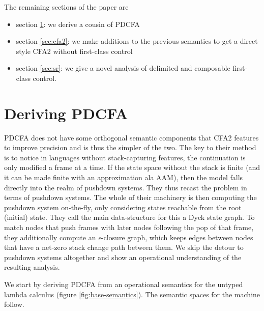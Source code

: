 The remaining sections of the paper are
\begin{itemize}
\item{section \ref{sec:pdcfa}: we derive a cousin of PDCFA}
\item{section \ref{sec:cfa2}: we make additions to the previous semantics to get a direct-style CFA2 without first-class control}
\item{section \ref{sec:sr}: we give a novel analysis of delimited and composable first-class control.}
\end{itemize}

\section{Deriving PDCFA}
\label{sec:pdcfa}

PDCFA does not have some orthogonal semantic components that CFA2 features to improve precision and is thus the simpler of the two.
%
The key to their method is to notice in languages without stack-capturing features, the continuation is only modified a frame at a time.
%
If the state space without the stack is finite (and it can be made finite with an approximation ala AAM), then the model falls directly into the realm of pushdown systems.
%
They thus recast the problem in terms of pushdown systems.
%
The whole of their machinery is then computing the pushdown system on-the-fly, only considering states reachable from the root (initial) state.
%
They call the main data-structure for this a Dyck state graph.
%
To match nodes that push frames with later nodes following the pop of that frame, they additionally compute an $\epsilon$-closure graph, which keeps edges between nodes that have a net-zero stack change path between them.
%
We skip the detour to pushdown systems altogether and show an operational understanding of the resulting analysis.

We start by deriving PDCFA from an operational semantics for the untyped lambda calculus (figure \ref{fig:base-semantics}).
%
The semantic spaces for the machine follow.

